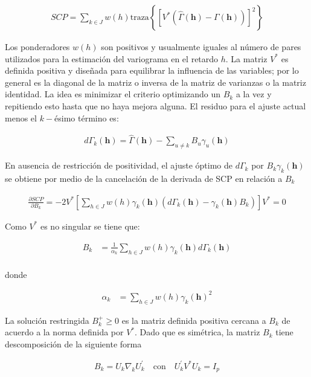 \documentclass[
]{book}
\begin{document}
\begin{align}
    SCP=\sum_{k\in J}w(h)\text{traza}\left\{ \left[V^{*}(\hat{\Gamma}(\textbf{h})-\Gamma(\textbf{h}))\right]^2\right\}
\end{align}

Los ponderadores \(w(h)\) son positivos y usualmente iguales al número de pares utilizados para la estimación del variograma en el retardo \(h\). La matriz \(V^{*}\) es definida positiva y diseñada para equilibrar la influencia de las variables; por lo general es la diagonal de la matriz o inversa de la matriz de varianzas o la matriz identidad. La idea es minimizar el criterio optimizando un \(B_k\) a la vez y repitiendo esto hasta que no haya mejora alguna. El residuo para el ajuste actual menos el \(k-\)ésimo término es:

\begin{align}
    d\Gamma_k(\textbf{h})=\hat{\Gamma}(\textbf{h})-\sum_{u\neq k}B_u\gamma_u(\textbf{h})
\end{align}

En ausencia de restricción de positividad, el ajuste óptimo de \(d\Gamma_k\) por \(B_k\gamma_k(\textbf{h})\) se obtiene por medio de la cancelación de la derivada de SCP en relación a \(B_k\)

\begin{align}
    \frac{\partial SCP}{\partial B_k}=-2V^{*}\left[ \sum_{h\in J}w(h)\gamma_k(\textbf{h})\left(d\Gamma_k(\textbf{h})-\gamma_k(\textbf{h})B_k\right)\right]V^{*}=0
\end{align}

Como \(V^{*}\) es no singular se tiene que:

\begin{align}
    B_k&=\frac{1}{\alpha_k}\sum_{h\in J}w(h)\gamma_k(\textbf{h})d\Gamma_k(\textbf{h})\\
\end{align}

donde

\begin{align}
    \alpha_k&=\sum_{h\in J}w(h)\gamma_k(\textbf{h})^2
\end{align}

La solución restringida \(B_k^{+} \geq 0\) es la matriz definida positiva cercana a \(B_k\) de acuerdo a la norma definida por \(V^{*}\). Dado que es simétrica, la matriz \(B_k\) tiene descomposición de la siguiente forma

\begin{align}
    B_k=U_k\nabla_k U_k^{'}\quad \text{con} \quad U_k^{'}V^{*}U_k=I_p
\end{align}
\end{document}
